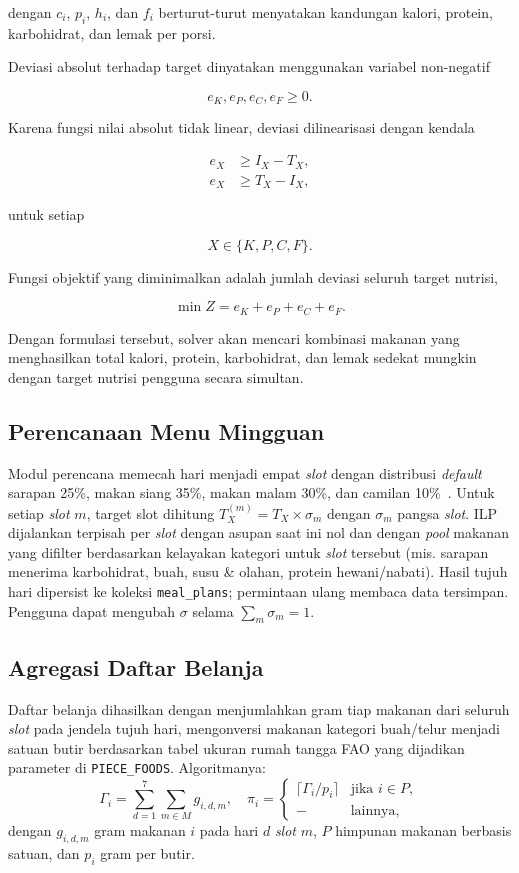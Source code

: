 \documentclass[conference]{IEEEtran}
\begin{document}
dengan $c_i$, $p_i$, $h_i$, dan $f_i$
berturut-turut menyatakan kandungan kalori,
protein, karbohidrat, dan lemak per porsi.

Deviasi absolut terhadap target dinyatakan
menggunakan variabel non-negatif

\[
e_K,e_P,e_C,e_F \ge 0.
\]

Karena fungsi nilai absolut tidak linear,
deviasi dilinearisasi dengan kendala

\begin{align}
e_X &\ge I_X - T_X,\\
e_X &\ge T_X - I_X,
\end{align}

untuk setiap

\[
X\in\{K,P,C,F\}.
\]

Fungsi objektif yang diminimalkan adalah jumlah
deviasi seluruh target nutrisi,

\begin{equation}
\min Z =
e_K + e_P + e_C + e_F.
\end{equation}

Dengan formulasi tersebut, solver akan mencari
kombinasi makanan yang menghasilkan total kalori,
protein, karbohidrat, dan lemak sedekat mungkin
dengan target nutrisi pengguna secara simultan.

\subsection{Perencanaan Menu Mingguan}
Modul perencana memecah hari menjadi empat \textit{slot} dengan distribusi \textit{default} sarapan 25\%, makan siang 35\%, makan malam 30\%, dan camilan 10\%~\cite{usda_dgaa}. Untuk setiap \textit{slot} $m$, target slot dihitung $T_X^{(m)} = T_X\times\sigma_m$ dengan $\sigma_m$ pangsa \textit{slot}. ILP dijalankan terpisah per \textit{slot} dengan asupan saat ini nol dan dengan \textit{pool} makanan yang difilter berdasarkan kelayakan kategori untuk \textit{slot} tersebut (mis. sarapan menerima karbohidrat, buah, susu \& olahan, protein hewani/nabati). Hasil tujuh hari dipersist ke koleksi \texttt{meal\_plans}; permintaan ulang membaca data tersimpan. Pengguna dapat mengubah $\sigma$ selama $\sum_m\sigma_m=1$.

\subsection{Agregasi Daftar Belanja}
Daftar belanja dihasilkan dengan menjumlahkan gram tiap makanan dari seluruh \textit{slot} pada jendela tujuh hari, mengonversi makanan kategori buah/telur menjadi satuan butir berdasarkan tabel ukuran rumah tangga FAO yang dijadikan parameter di \texttt{PIECE\_FOODS}. Algoritmanya:
\begin{equation}
\Gamma_i = \sum_{d=1}^{7}\sum_{m\in M} g_{i,d,m},\quad
\pi_i =
\begin{cases}
\lceil \Gamma_i / p_i \rceil & \text{jika } i\in P,\\
- & \text{lainnya},
\end{cases}
\end{equation}
dengan $g_{i,d,m}$ gram makanan $i$ pada hari $d$ \textit{slot} $m$, $P$ himpunan makanan berbasis satuan, dan $p_i$ gram per butir.
\end{document}
